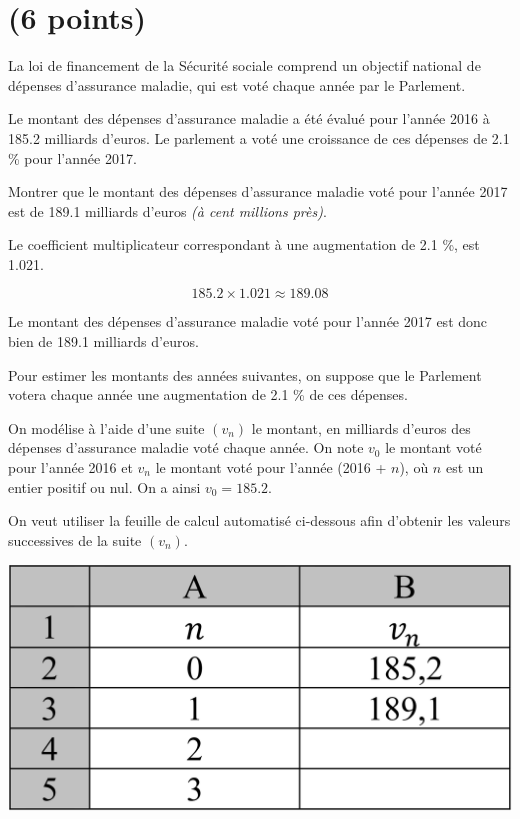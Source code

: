 \section{(6 points)}\label{ex:secu}

La loi de financement de la Sécurité sociale comprend un objectif national de dépenses d'assurance maladie, qui est voté chaque année par le Parlement.

Le montant des dépenses d'assurance maladie a été évalué pour l'année 2016 à \num{185.2} milliards d'euros. Le parlement a voté une croissance de ces dépenses de \num{2.1} \% pour l'année 2017.



\begin{questions}
	\question Montrer que le montant des dépenses  d'assurance maladie voté pour l'année 2017 est de \num{189.1} milliards d'euros \emph{(à cent millions près)}.
	
	\begin{solution}
		Le coefficient multiplicateur correspondant à une augmentation de \num{2.1} \%, est \num{1.021}.
		
		\begin{equation*}
			\num{185.2} \times \num{1.021} \approx \num{189.08}
		\end{equation*}
		
		Le montant des dépenses  d'assurance maladie voté pour l'année 2017 est donc bien de \num{189.1} milliards d'euros.
	\end{solution}
	
	
	
\end{questions}



Pour estimer les montants des années suivantes, on suppose que le Parlement votera chaque année une augmentation de \num{2.1} \% de ces dépenses.

On modélise à l'aide d'une suite $(v_n)$ le montant, en milliards d'euros des dépenses d'assurance maladie voté chaque année. On note $v_0$ le montant voté pour l'année 2016 et $v_n$ le montant voté pour l'année (2016 + $n$), où $n$ est un entier positif ou nul. On a ainsi $v_0 = \num{185.2}$.


 On veut utiliser la feuille de calcul automatisé ci-dessous afin d'obtenir les valeurs successives de la suite $(v_n)$.
 
 \begin{center}
 	\includegraphics[scale=0.2]{img/secu}
 \end{center}

